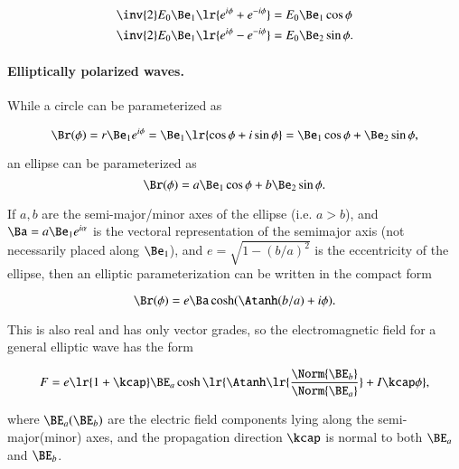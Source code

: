 \begin{dmath}\label{eqn:ellipticalWaves:300}
\begin{aligned}
   \inv{2} E_0 \Be_1 \lr{ e^{i \phi} + e^{-i\phi} } &= E_0 \Be_1 \cos\phi \\
   \inv{2} E_0 \Be_1 \lr{ e^{i \phi} - e^{-i\phi} } &= E_0 \Be_2 \sin\phi.
\end{aligned}
\end{dmath}

\paragraph{Elliptically polarized waves.}

While a circle can be parameterized as

\begin{dmath}\label{eqn:ellipticalWaves:320}
\Br(\phi)
=
r \Be_1 e^{i \phi}
=
\Be_1 \lr{ \cos\phi + i \sin\phi }
=
\Be_1 \cos\phi + \Be_2 \sin\phi,
\end{dmath}

an ellipse can be parameterized as
\begin{dmath}\label{eqn:ellipticalWaves:340}
\Br(\phi)
=
a \Be_1 \cos\phi + b \Be_2 \sin\phi.
\end{dmath}

If \( a, b \) are the semi-major/minor axes of the ellipse (i.e. \( a > b \)),
and \( \Ba = a \Be_1 e^{i\alpha} \) is the vectoral representation of the semimajor axis (not necessarily placed along \( \Be_1 \)),
and \( e = \sqrt{1 - (b/a)^2} \) is the eccentricity of the ellipse,
then an elliptic parameterization can be written
\citep{hestenes1999nfc}
in the compact form

\begin{dmath}\label{eqn:ellipticalWaves:360}
\Br(\phi)
=
e \Ba \cosh( \Atanh(b/a) + i \phi).
\end{dmath}

This is also real and has only vector grades, so the electromagnetic field for a general elliptic wave has the form

\begin{dmath}\label{eqn:ellipticalWaves:380}
F
=
e \lr{ 1 + \kcap } \BE_a
\cosh\lr{ \Atanh\lr{ \frac{\Norm{\BE_b}}{\Norm{\BE_a}}} + I \kcap \phi},
\end{dmath}

where \( \BE_a(\BE_b) \) are the electric field components lying along the semi-major(minor) axes, and the propagation direction \( \kcap \) is normal to both \( \BE_a \) and \(\BE_b\).

